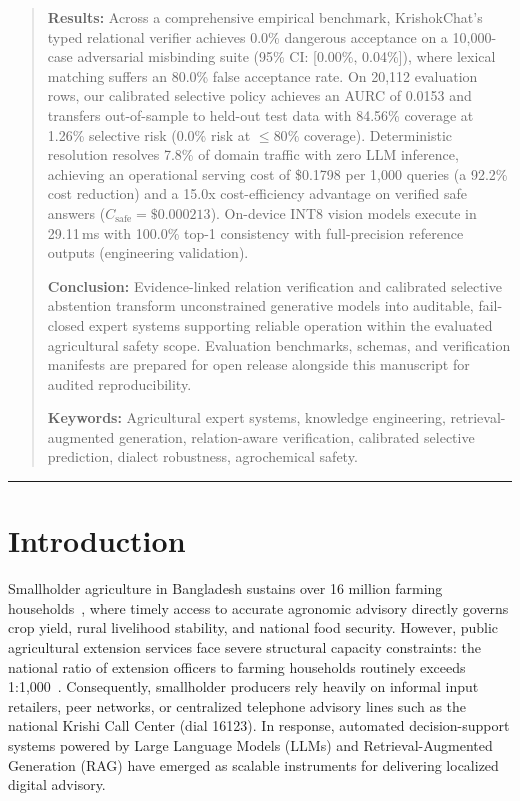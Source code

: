 \documentclass[11pt,a4paper]{article}
\begin{document}
\begin{quote}
\vspace{0.3em}
\noindent
\textbf{Results:} Across a comprehensive empirical benchmark, KrishokChat's typed relational verifier achieves 0.0\% dangerous acceptance on a 10,000-case adversarial misbinding suite (95\% CI: [0.00\%, 0.04\%]), where lexical matching suffers an 80.0\% false acceptance rate. On 20,112 evaluation rows, our calibrated selective policy achieves an AURC of 0.0153 and transfers out-of-sample to held-out test data with 84.56\% coverage at 1.26\% selective risk (0.0\% risk at $\le 80\%$ coverage). Deterministic resolution resolves 7.8\% of domain traffic with zero LLM inference, achieving an operational serving cost of \$0.1798 per 1,000 queries (a 92.2\% cost reduction) and a 15.0x cost-efficiency advantage on verified safe answers ($C_{\text{safe}} = \$0.000213$). On-device INT8 vision models execute in 29.11\,ms with 100.0\% top-1 consistency with full-precision reference outputs (engineering validation).

\vspace{0.3em}
\noindent
\textbf{Conclusion:} Evidence-linked relation verification and calibrated selective abstention transform unconstrained generative models into auditable, fail-closed expert systems supporting reliable operation within the evaluated agricultural safety scope. Evaluation benchmarks, schemas, and verification manifests are prepared for open release alongside this manuscript for audited reproducibility.

\vspace{0.8em}
\noindent\textbf{Keywords:} Agricultural expert systems, knowledge engineering, retrieval-augmented generation, relation-aware verification, calibrated selective prediction, dialect robustness, agrochemical safety.
\end{quote}

\vspace{0.8em}
\hrule
\vspace{1.2em}


\section{Introduction}
\label{sec:introduction}

Smallholder agriculture in Bangladesh sustains over 16 million farming households~\cite{bbs2019}, where timely access to accurate agronomic advisory directly governs crop yield, rural livelihood stability, and national food security. However, public agricultural extension services face severe structural capacity constraints: the national ratio of extension officers to farming households routinely exceeds 1:1{,}000~\cite{dae2021}. Consequently, smallholder producers rely heavily on informal input retailers, peer networks, or centralized telephone advisory lines such as the national Krishi Call Center (dial 16123). In response, automated decision-support systems powered by Large Language Models (LLMs) and Retrieval-Augmented Generation (RAG) have emerged as scalable instruments for delivering localized digital advisory.
\end{document}
